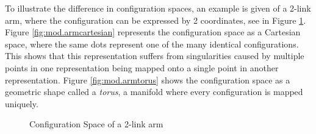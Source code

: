 To illustrate the difference in configuration spaces, an example is given of a 2-link arm, where the configuration can be expressed by 2 coordinates, see in Figure \ref{fig:mod.armmanifold}. Figure \ref{fig:mod.armcartesian} represents the configuration space as a Cartesian space, where the same dots represent one of the many identical configurations. This shows that this representation suffers from singularities caused by multiple points in one representation being mapped onto a single point in another representation. Figure \ref{fig:mod.armtorus} shows the configuration space as a geometric shape called a \textit{torus}, a manifold where every configuration is mapped uniquely.
\begin{figure}[h!]
	\centering
	\caption{Configuration Space of a 2-link arm\label{fig:mod.armmanifold}}
\end{figure}		



